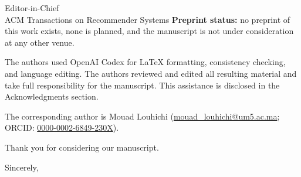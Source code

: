 \documentclass[10pt]{letter}
\begin{document}
\begin{letter}{%
Editor-in-Chief\\
ACM Transactions on Recommender Systems}
\textbf{Preprint status:} no preprint of this work exists, none is planned, and the manuscript is not under consideration at any other venue.

The authors used OpenAI Codex for LaTeX formatting, consistency checking, and language editing. The authors reviewed and edited all resulting material and take full responsibility for the manuscript. This assistance is disclosed in the Acknowledgments section.

The corresponding author is Mouad Louhichi
(\href{mailto:mouad_louhichi@um5.ac.ma}{mouad\_louhichi@um5.ac.ma};
ORCID: \href{https://orcid.org/0000-0002-6849-230X}{0000-0002-6849-230X}).

Thank you for considering our manuscript.

\closing{Sincerely,}

\end{letter}
\end{document}
